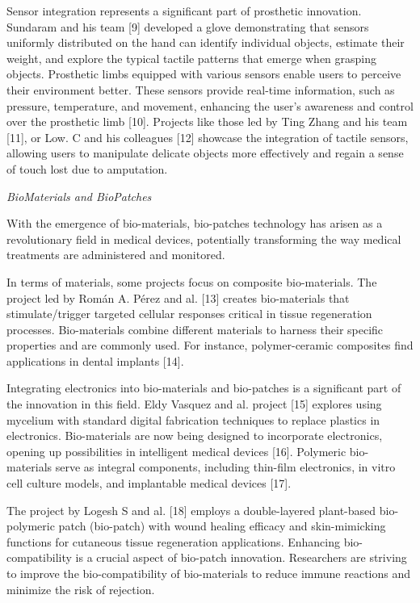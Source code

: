 Sensor integration represents a significant part of prosthetic innovation. Sundaram and his team [9] developed a glove demonstrating that sensors uniformly distributed on the hand can identify individual objects, estimate their weight, and explore the typical tactile patterns that emerge when grasping objects. Prosthetic limbs equipped with various sensors enable users to perceive their environment better. These sensors provide real-time information, such as pressure, temperature, and movement, enhancing the user's awareness and control over the prosthetic limb [10]. Projects like those led by Ting Zhang and his team [11], or Low. C and his colleagues [12] showcase the integration of tactile sensors, allowing users to manipulate delicate objects more effectively and regain a sense of touch lost due to amputation.

\textit{BioMaterials and BioPatches}

With the emergence of bio-materials, bio-patches technology has arisen as a revolutionary field in medical devices, potentially transforming the way medical treatments are administered and monitored.

In terms of materials, some projects focus on composite bio-materials. The project led by Román A. Pérez and al. [13] creates bio-materials that stimulate/trigger targeted cellular responses critical in tissue regeneration processes. Bio-materials combine different materials to harness their specific properties and are commonly used. For instance, polymer-ceramic composites find applications in dental implants [14].

Integrating electronics into bio-materials and bio-patches is a significant part of the innovation in this field. Eldy Vasquez and al. project [15] explores using mycelium with standard digital fabrication techniques to replace plastics in electronics. Bio-materials are now being designed to incorporate electronics, opening up possibilities in intelligent medical devices [16]. Polymeric bio-materials serve as integral components, including thin-film electronics, in vitro cell culture models, and implantable medical devices [17].

The project by Logesh S and al. [18] employs a double-layered plant-based bio-polymeric patch (bio-patch) with wound healing efficacy and skin-mimicking functions for cutaneous tissue regeneration applications. Enhancing bio-compatibility is a crucial aspect of bio-patch innovation. Researchers are striving to improve the bio-compatibility of bio-materials to reduce immune reactions and minimize the risk of rejection.

